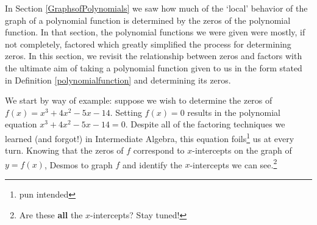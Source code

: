 \documentclass{ximera}
\begin{document}
	\author{Stitz-Zeager}




\setcounter{footnote}{0}

\label{Polydivision}

In Section \ref{GraphsofPolynomials} we saw how much of the `local' behavior of the graph of a polynomial function is  determined by the zeros of the polynomial function.  In that section, the polynomial functions we were given were mostly, if not completely, factored which greatly simplified the process for determining zeros.  In this section, we revisit the relationship between zeros and factors with the ultimate aim of taking a polynomial function given to us in the form stated in Definition \ref{polynomialfunction}  and determining its zeros. 

 




We start by way of example:  suppose we wish to determine the zeros of  $f(x) = x^3 + 4x^2-5x-14$.  Setting $f(x)=0$ results in the polynomial equation $x^3 + 4x^2-5x-14=0$.   Despite all of the factoring techniques we learned (and forgot!) in Intermediate Algebra, this equation foils\footnote{pun intended} us at every turn. Knowing that the zeros of $f$ correspond to $x$-intercepts on the graph of $y=f(x)$, Desmos to graph $f$ and identify the $x$-intercepts we can see.\footnote{Are these \textbf{all} the $x$-intercepts?  Stay tuned!}
\end{document}
